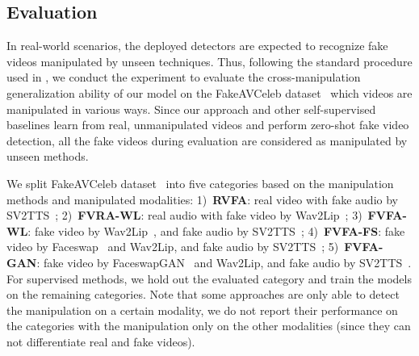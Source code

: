 \documentclass[10pt,twocolumn,letterpaper]{article}
\begin{document}
\subsection{Evaluation}
In real-world scenarios, the deployed detectors are expected to recognize fake videos manipulated by unseen techniques. Thus, following the standard procedure used in \cite{haliassos2022leveraging, haliassos2021lips, zheng2021exploring, zhou2021joint}, we conduct the experiment to evaluate the cross-manipulation generalization ability of our model on the FakeAVCeleb dataset~\cite{NEURIPS_DATASETS_AND_BENCHMARKS2021_d9d4f495} which videos are manipulated in various ways. Since our approach and other self-supervised baselines learn from real, unmanipulated videos and perform zero-shot fake video detection, all the fake videos during evaluation are considered as manipulated by unseen methods.

We split FakeAVCeleb dataset~\cite{NEURIPS_DATASETS_AND_BENCHMARKS2021_d9d4f495} into five categories based on the manipulation methods and manipulated modalities: 
1)~{\bf RVFA}: real video with fake audio by SV2TTS~\cite{jia2018transfer}; 
2)~{\bf FVRA-WL}: real audio with fake video by Wav2Lip~\cite{prajwal2020lip}; 
3)~{\bf FVFA-WL}: fake video by Wav2Lip~\cite{prajwal2020lip}, and fake audio by SV2TTS~\cite{jia2018transfer};
4)~{\bf FVFA-FS}: fake video by Faceswap~\cite{korshunova2017fast} and Wav2Lip\cite{prajwal2020lip}, and fake audio by SV2TTS~\cite{jia2018transfer};
5)~{\bf FVFA-GAN}: fake video by FaceswapGAN~\cite{nirkin2019fsgan} and Wav2Lip\cite{prajwal2020lip}, and fake audio by SV2TTS~\cite{jia2018transfer}.
For supervised methods, we hold out the evaluated category and train the models on the remaining categories. Note that some approaches are only able to detect the manipulation on a certain modality, we do not report their performance on the categories with the manipulation only on the other modalities (since they can not differentiate real and fake videos).
\end{document}
